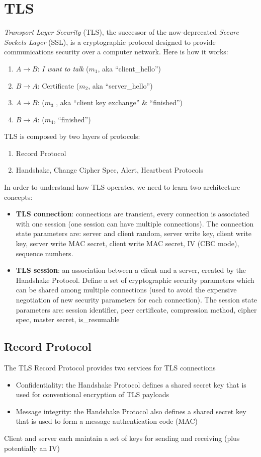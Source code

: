 \section{TLS}
\textit{Transport Layer Security} (TLS), the successor of the now-deprecated \textit{Secure Sockets Layer} (SSL), is a cryptographic protocol designed to provide communications security over a computer network. Here is how it works:
\begin{enumerate}
    \item $A\rightarrow B$: \textit{I want to talk} ($m_1$, aka “client\_hello”)
    \item $B\rightarrow A$: Certificate ($m_2$, aka “server\_hello”)
    \item $A\rightarrow B$: ($m_3$ , aka “client key exchange” \& “finished”)
    \item $B\rightarrow A$: ($m_4$, “finished”)
\end{enumerate}
TLS is composed by two layers of protocols:
\begin{enumerate}
    \item Record Protocol
    \item Handshake, Change Cipher Spec, Alert, Heartbeat Protocols
\end{enumerate}
In order to understand how TLS operates, we need to learn two architecture concepts:
\begin{itemize}
    \item \textbf{TLS connection}: connections are transient, every connection is associated with one session (one session can have multiple connections). The connection state parameters are: server and client random, server write key, client write key, server write MAC secret, client write MAC secret, IV (CBC mode), sequence numbers.
    \item \textbf{TLS session}: an association between a client and a server, created by the Handshake Protocol. Define a set of cryptographic security parameters which can be shared among multiple connections (used to avoid the expensive negotiation of new security parameters for each connection).
    The session state parameters are: session identifier, peer certificate, compression method, cipher spec, master secret, is\_resumable
\end{itemize}
\subsection{Record Protocol}
The TLS Record Protocol provides two services for TLS connections
\begin{itemize}
    \item Confidentiality: the Handshake Protocol defines a shared secret key that is used for conventional encryption of TLS payloads
    \item Message integrity: the Handshake Protocol also defines a shared secret key that is used to form a message authentication code (MAC)
\end{itemize}
Client and server each maintain a set of keys for sending and receiving (plus potentially an IV)
